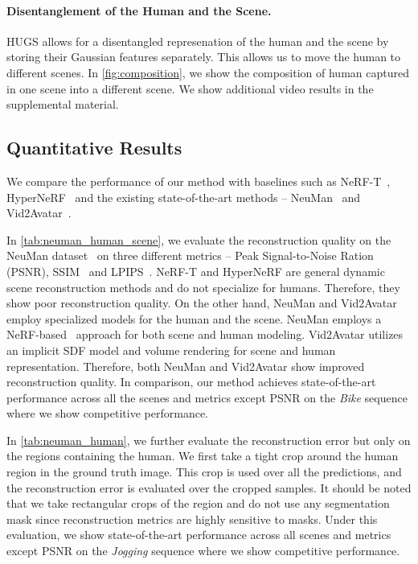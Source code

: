 



\paragraph{Disentanglement of the Human and the Scene.} HUGS allows for a disentangled represenation of the human and the scene by storing their Gaussian features separately. This allows us to move the human to different scenes. In \cref{fig:composition}, we show the composition of human captured in one scene into a different scene. We show additional video results in the supplemental material.


\subsection{Quantitative Results}
\label{sec:quantitative}
We compare the performance of our method with baselines such as NeRF-T~\cite{li2021neural}, HyperNeRF~\cite{park2021hypernerf} and the existing state-of-the-art methods -- NeuMan~\cite{jiang2022neuman} and Vid2Avatar~\cite{guo2023vid2avatar}.

In \cref{tab:neuman_human_scene}, we evaluate the reconstruction quality on the NeuMan dataset~\cite{jiang2022neuman} on three different metrics -- Peak Signal-to-Noise Ration (PSNR), SSIM~\cite{ssim} and LPIPS~\cite{zhang2018lpips}. NeRF-T and HyperNeRF are general dynamic scene reconstruction methods and do not specialize for humans. Therefore, they show poor reconstruction quality. On the other hand, NeuMan and Vid2Avatar employ specialized models for the human and the scene. NeuMan employs a NeRF-based~\cite{mildenhall2020nerf} approach for both scene and human modeling. Vid2Avatar utilizes an implicit SDF model and volume rendering for scene and human representation. Therefore, both NeuMan and Vid2Avatar show improved reconstruction quality. In comparison, our method achieves state-of-the-art performance across all the scenes and metrics except PSNR on the \textit{Bike} sequence where we show competitive performance.

In \cref{tab:neuman_human}, we further evaluate the reconstruction error but only on the regions containing the human. We first take a tight crop around the human region in the ground truth image. This crop is used over all the predictions, and the reconstruction error is evaluated over the cropped samples. It should be noted that we take rectangular crops of the region and do not use any segmentation mask since reconstruction metrics are highly sensitive to masks. Under this evaluation, we show state-of-the-art performance across all scenes and metrics except PSNR on the \textit{Jogging} sequence where we show competitive performance. 

